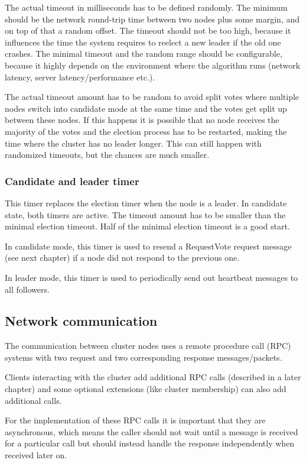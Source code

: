The actual timeout in milliseconds has to be defined randomly. The minimum should be the network round-trip time between two nodes plus some margin,
and on top of that a random offset. The timeout should not be too high, because it influences the time the system requires to reelect a new leader
if the old one crashes. The minimal timeout and the random range should be configurable, because it highly depends on the environment where the algorithm runs
(network latency, server latency/performance etc.).

The actual timeout amount has to be random to avoid split votes where multiple nodes switch into candidate mode at the same time and the votes get split
up between these nodes. If this happens it is possible that no node receives the majority of the votes and the election process has to be restarted,
making the time where the cluster has no leader longer. This can still happen with randomized timeouts, but the chances are much smaller.

\subsubsection*{Candidate and leader timer}
This timer replaces the election timer when the node is a leader. In candidate state, both timers are active.
The timeout amount has to be smaller than the minimal election timeout. Half of the minimal election timeout is a good start.

In candidate mode, this timer is used to resend a RequestVote request message (see next chapter) if a node did not respond to the previous one.

In leader mode, this timer is used to periodically send out heartbeat messages to all followers.

\subsection{Network communication}

The communication between cluster nodes uses a remote procedure call (RPC) systems with two request and two corresponding response messages/packets.

Clients interacting with the cluster add additional RPC calls (described in a later chapter) and some optional extensions (like cluster membership) can also
add additional calls.

For the implementation of these RPC calls it is important that they are asynchronous, which means the caller should not wait until a message is received
for a particular call but should instead handle the response independently when received later on.

